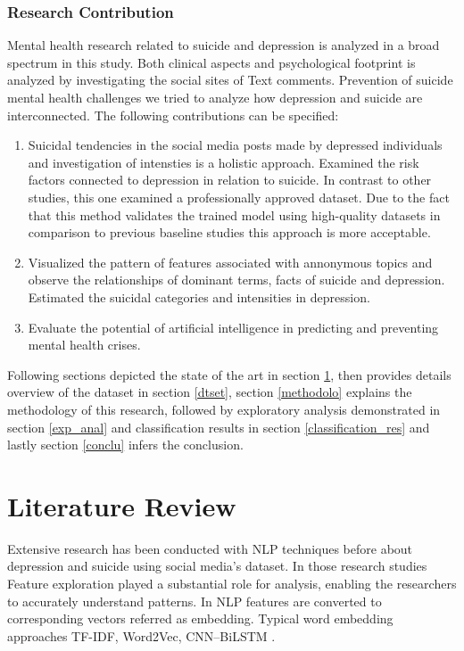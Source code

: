 \documentclass[sn-mathphys,Numbered]{sn-jnl}%
\theoremstyle{thmstyleone}%
\theoremstyle{thmstyletwo}%
\theoremstyle{thmstylethree}%
\begin{document}
\subsubsection{Research Contribution}
Mental health research related to suicide and depression is analyzed in a broad spectrum in this study. Both clinical aspects and psychological footprint is analyzed by investigating the social sites of Text comments. Prevention of suicide mental health challenges we tried to analyze how depression and suicide are interconnected. The following contributions can be specified:
%
\begin{enumerate}
\item Suicidal tendencies in the social media posts made by depressed individuals and investigation of intensties is a holistic approach. Examined the risk factors connected to depression in relation to suicide. In contrast to other studies, this one examined a professionally approved dataset. Due to the fact that this method validates the trained model using high-quality datasets in comparison to previous baseline studies this approach is more acceptable. 
\item  Visualized the pattern of features associated with annonymous topics and observe the relationships of dominant terms, facts of suicide and depression. Estimated the suicidal categories and intensities in depression. 
\item Evaluate the potential of artificial intelligence in predicting and preventing mental health crises.
\end{enumerate}

Following sections depicted the state of the art in section \ref{lit_rev}, then provides details overview of the dataset in section \ref{dtset}, section \ref{methodolo} explains the methodology of this research, followed by exploratory analysis demonstrated in section \ref{exp_anal} and classification results in section \ref{classification_res} and lastly section \ref{conclu} infers the conclusion. 

\section{Literature Review}
\label{lit_rev}
Extensive research has been conducted with NLP techniques before about depression and suicide using social media's dataset. In those research studies Feature exploration played a substantial role for analysis, enabling the researchers to accurately understand patterns. In NLP features are converted to corresponding vectors referred as embedding. Typical word embedding approaches TF-IDF, Word2Vec, CNN–BiLSTM \cite{aldhyani2022detecting, chancellor2020methods, wang2020depression, malhotra2022deep}. 
\end{document}
